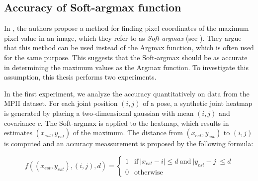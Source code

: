 \subsection{Accuracy of Soft-argmax function}
\label{sec:exp-softargmax-accuracy}
In \cite{luvizon_human_2017}, the authors propose a method for finding pixel coordinates of the maximum pixel value in an image, which they refer to as \textit{Soft-argmax} (see ).
They argue that this method can be used instead of the Argmax function, which is often used for the same purpose.
This suggests that the Soft-argmax should be as accurate in determining the maximum values as the Argmax function.
To investigate this assumption, this thesis performs two experiments.

In the first experiment, we analyze the accuracy quantitatively on data from the MPII dataset.
For each joint position $(i,j)$ of a pose, a synthetic joint heatmap is generated by placing a two-dimensional gaussian with mean $(i,j)$ and covariance $c$.
The Soft-argmax is applied to the heatmap, which results in estimates $(x_{est},y_{est})$ of the maximum.
The distance from $(x_{est},y_{est})$ to $(i,j)$ is computed and an accuracy meassurement is proposed by the following formula:

\begin{equation}
    f((x_{est}, y_{est}), (i,j), d) = 
    \begin{cases}
        1 & \text{if} ~ \lvert x_{est} - i \rvert \leq d ~ \text{and} ~ \lvert y_{est} - j \rvert \leq d \\
        0 & \text{otherwise}
    \end{cases}
    \label{eq:acc_softargmax}
\end{equation}

